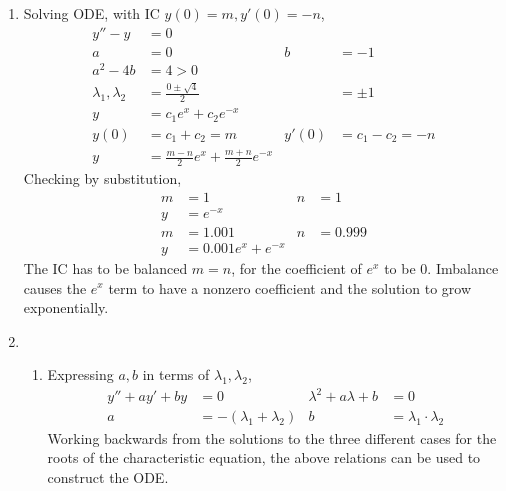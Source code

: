 \begin{enumerate}
    \item Solving ODE, with IC $ y(0) = m , y'(0) = -n$,
          \begin{align}
              y'' - y                  & = 0                                                                       \\
              a                        & = 0                                        & b     & = -1                 \\
              a^{2} - 4b               & = 4 > 0                                                                   \\
              \lambda_{1}, \lambda_{2} & = \frac{0 \pm \sqrt{4}}{2}                 &       & = \pm 1              \\
              y                        & = c_{1}e^{x} + c_{2}e^{-x}                                                \\
              y(0)                     & = c_{1} + c_{2} = m                        & y'(0) & = c_{1} - c_{2} = -n \\
              y                        & = \frac{m-n}{2}e^{x} + \frac{m+n}{2}e^{-x}
          \end{align}
          Checking by substitution,
          \begin{align}
              m & = 1                   & n & =1      \\
              y & = e^{-x}                            \\
              m & = 1.001               & n & = 0.999 \\
              y & = 0.001e^{x} + e^{-x}
          \end{align}
          The IC has to be balanced $ m = n $, for the coefficient of $ e^{x} $ to be $ 0 $.
          Imbalance causes the $ e^{x} $ term to have a nonzero coefficient and the solution
          to grow exponentially.

    \item
          \begin{enumerate}
              \item Expressing $ a,b $ in terms of $ \lambda_{1}, \lambda_{2} $,
                    \begin{align}
                        y'' + ay' + by & = 0                            & \lambda^{2} + a\lambda + b & = 0                             \\
                        a              & = -(\lambda_{1} + \lambda_{2}) & b                          & = \lambda_{1} \cdot \lambda_{2}
                    \end{align}
                    Working backwards from the solutions to the three different cases for the roots of
                    the characteristic equation, the above relations can be used to construct the
                    ODE.


\end{enumerate}
\end{enumerate}
